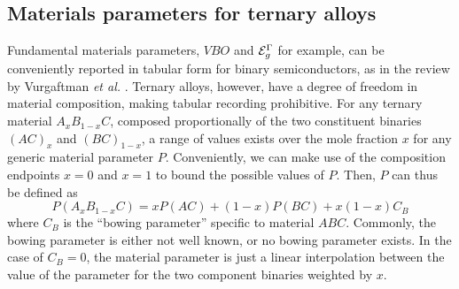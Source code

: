 \documentclass[12pt]{report}
\begin{document}
\subsection{Materials parameters for ternary alloys}

Fundamental materials parameters, $VBO$ and $\EE_g^\Gamma$ for example, can be conveniently reported in tabular form for binary semiconductors, as in the review by Vurgaftman \emph{et al.} \cite{Vurgaftman}.  Ternary alloys, however, have a degree of freedom in material composition, making tabular recording prohibitive.  For any ternary material $A_x B_{1-x} C$, composed proportionally of the two constituent binaries $(AC)_x$ and $(BC)_{1-x}$, a range of values exists over the mole fraction $x$ for any generic material parameter $P$.  Conveniently, we can make use of the composition endpoints $x=0$ and $x=1$ to bound the possible values of $P$.  Then, $P$ can thus be defined as
\begin{equation}
P(A_x B_{1-x} C) = x P(AC) + (1-x) P(BC) + x(1-x) C_B
\end{equation}
where $C_B$ is the ``bowing parameter'' specific to material $ABC$.  Commonly, the bowing parameter is either not well known, or no bowing parameter exists.  In the case of $C_B=0$, the material parameter is just a linear interpolation between the value of the parameter for the two component binaries weighted by $x$.


\end{document}
